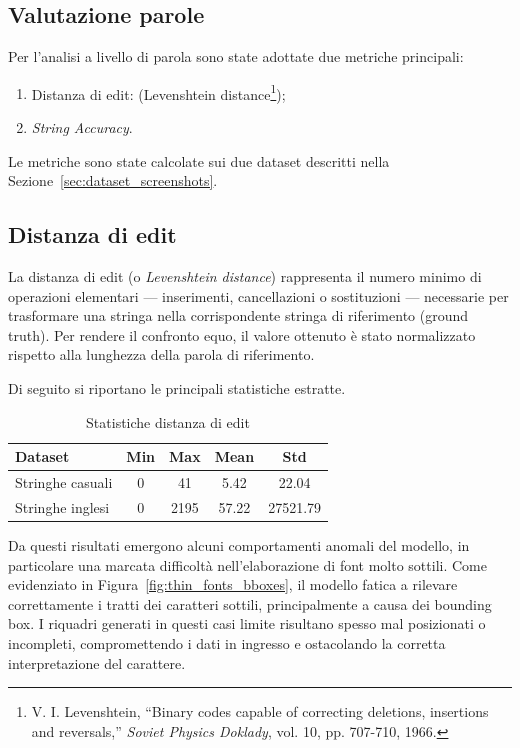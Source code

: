 \subsection{Valutazione parole}
\label{sec:valutazione-stringhe}

Per l'analisi a livello di parola sono state adottate due metriche principali:
\begin{enumerate}
    \item Distanza di edit: (Levenshtein distance\footnote{V. I. Levenshtein, “Binary codes capable of correcting deletions, insertions and reversals,” \textit{Soviet Physics Doklady}, vol. 10, pp. 707-710, 1966.});
    \item \emph{String Accuracy}.
\end{enumerate}

Le metriche sono state calcolate sui due dataset descritti nella Sezione~\ref{sec:dataset_screenshots}.

\subsection*{Distanza di edit}

La distanza di edit (o \emph{Levenshtein distance}) rappresenta il numero minimo di operazioni elementari — inserimenti, cancellazioni o sostituzioni — necessarie per trasformare una stringa nella corrispondente stringa di riferimento (ground truth).  
Per rendere il confronto equo, il valore ottenuto è stato normalizzato rispetto alla lunghezza della parola di riferimento.

Di seguito si riportano le principali statistiche estratte.

\begin{table}[htbp]
    \centering
    \begin{tabular}{lcccc}
        \toprule
        Dataset                 & Min   & Max   & Mean  & Std   \\
        \midrule
        Stringhe casuali       & 0  & 41 & 5.42  & 22.04 \\
        Stringhe inglesi & 0  & 2195 & 57.22  & 27521.79 \\
        \bottomrule
    \end{tabular}
    \caption{Statistiche distanza di edit}
    \label{tab:edit_distance_stats}
\end{table}

Da questi risultati emergono alcuni comportamenti anomali del modello, in particolare una marcata difficoltà nell'elaborazione di font molto sottili. Come evidenziato in Figura~\ref{fig:thin_fonts_bboxes}, il modello fatica a rilevare correttamente i tratti dei caratteri sottili, principalmente a causa dei bounding box. I riquadri generati in questi casi limite risultano spesso mal posizionati o incompleti, compromettendo i dati in ingresso e ostacolando la corretta interpretazione del carattere.

